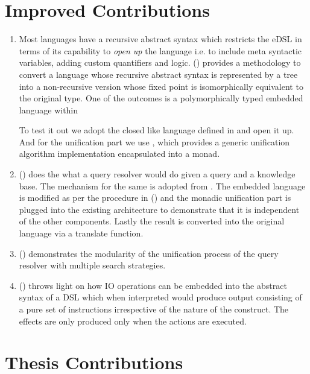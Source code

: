 \documentclass[thesis-solanki.tex]{subfiles}
\begin{document}
\section{Improved Contributions}
\begin{enumerate}
\item
  Most languages have a recursive abstract syntax which restricts the eDSL in terms of its capability to
  \textit{open up} the language i.e.
  to include meta syntactic variables, adding custom quantifiers and logic.
  () provides a methodology to convert a language whose recursive abstract
  syntax is represented by a tree into a non-recursive version whose fixed point is isomorphically equivalent to
  the original type.
  One of the outcomes is a polymorphically typed embedded language within 

  To test it out we adopt the closed  like language defined in \cite{prolog-lib} and open it up.
  And for the unification part we use \cite{unification-fd-lib}, which provides a generic unification algorithm
  implementation encapsulated into a monad.

\item
  () does the what a  query resolver would do given a
  query and a knowledge base.
  The mechanism for the same is adopted from \cite{prolog-lib}.
  The embedded language is modified as per the procedure in () and the
  monadic unification part is plugged into the existing architecture to demonstrate that it is independent of the
  other components.
  Lastly the result is converted into the original language via a translate function.

\item
  () demonstrates the modularity of the unification process of the query
  resolver with multiple search strategies.

\item
  () throws light on how IO operations can be embedded into the abstract
  syntax of a DSL which when interpreted would produce output consisting of a pure set of instructions irrespective
  of the nature of the construct.
  The effects are only produced only when the actions are executed.
\end{enumerate}



\section{Thesis Contributions}
\end{document}
